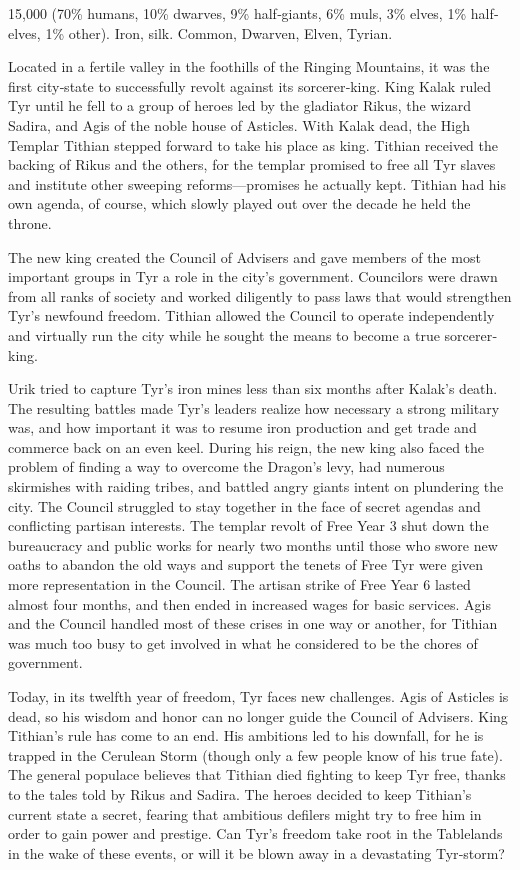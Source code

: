 {15,000 (70\% humans, 10\% dwarves, 9\% half‐giants, 6\% muls, 3\% elves, 1\% half‐elves, 1\% other).}
{Iron, silk.}
{Common, Dwarven, Elven, Tyrian.}
{
	Located in a fertile valley in the foothills of the Ringing Mountains, it was the first city‐state to successfully revolt against its sorcerer‐king. King Kalak ruled Tyr until he fell to a group of heroes led by the gladiator Rikus, the wizard Sadira, and Agis of the noble house of Asticles. With Kalak dead, the High Templar Tithian stepped forward to take his place as king. Tithian received the backing of Rikus and the others, for the templar promised to free all Tyr slaves and institute other sweeping reforms—promises he actually kept. Tithian had his own agenda, of course, which slowly played out over the decade he held the throne.

	The new king created the Council of Advisers and gave members of the most important groups in Tyr a role in the city’s government. Councilors were drawn from all ranks of society and worked diligently to pass laws that would strengthen Tyr’s newfound freedom. Tithian allowed the Council to operate independently and virtually run the city while he sought the means to become a true sorcerer‐king.

	Urik tried to capture Tyr’s iron mines less than six months after Kalak’s death. The resulting battles made Tyr’s leaders realize how necessary a strong military was, and how important it was to resume iron production and get trade and commerce back on an even keel. During his reign, the new king also faced the problem of finding a way to overcome the Dragon’s levy, had numerous skirmishes with raiding tribes, and battled angry giants intent on plundering the city. The Council struggled to stay together in the face of secret agendas and conflicting partisan interests. The templar revolt of Free Year 3 shut down the bureaucracy and public works for nearly two months until those who swore new oaths to abandon the old ways and support the tenets of Free Tyr were given more representation in the Council. The artisan strike of Free Year 6 lasted almost four months, and then ended in increased wages for basic services. Agis and the Council handled most of these crises in one way or another, for Tithian was much too busy to get involved in what he considered to be the chores of government.

	Today, in its twelfth year of freedom, Tyr faces new challenges. Agis of Asticles is dead, so his wisdom and honor can no longer guide the Council of Advisers. King Tithian’s rule has come to an end. His ambitions led to his downfall, for he is trapped in the Cerulean Storm (though only a few people know of his true fate). The general populace believes that Tithian died fighting to keep Tyr free, thanks to the tales told by Rikus and Sadira. The heroes decided to keep Tithian’s current state a secret, fearing that ambitious defilers might try to free him in order to gain power and prestige. Can Tyr’s freedom take root in the Tablelands in the wake of these events, or will it be blown away in a devastating Tyr‐storm?

}
